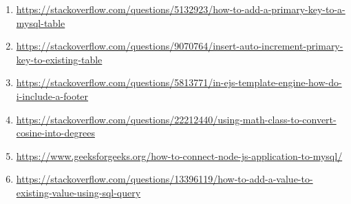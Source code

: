 \documentclass[12pt,a4paper]{report}
\begin{document}
\begin{enumerate}
    \item \raggedright \url{https://stackoverflow.com/questions/5132923/how-to-add-a-primary-key-to-a-mysql-table}
    \item \raggedright \url{https://stackoverflow.com/questions/9070764/insert-auto-increment-primary-key-to-existing-table}
    \item \raggedright \url{https://stackoverflow.com/questions/5813771/in-ejs-template-engine-how-do-i-include-a-footer}
    \item \raggedright \url{https://stackoverflow.com/questions/22212440/using-math-class-to-convert-cosine-into-degrees}
    \item \raggedright \url{https://www.geeksforgeeks.org/how-to-connect-node-js-application-to-mysql/}
    \item \raggedright \url{https://stackoverflow.com/questions/13396119/how-to-add-a-value-to-existing-value-using-sql-query}
\end{enumerate}
\end{document}
